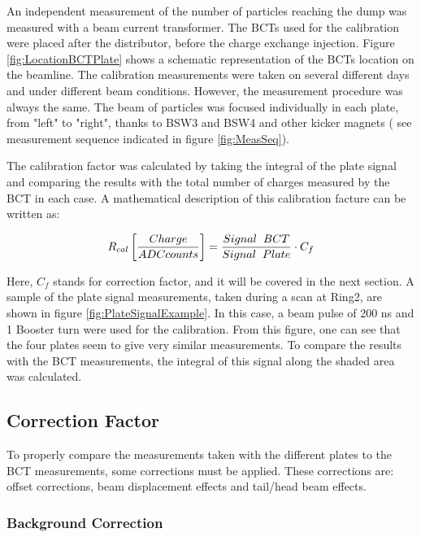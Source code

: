An independent measurement of the number of particles reaching the dump was measured with a beam current transformer. The BCTs used for the calibration were placed after the distributor, before the charge exchange injection. Figure \ref{fig:LocationBCTPlate} shows a schematic representation of the BCTs location on the beamline.  The calibration measurements were taken on several different days and under different beam conditions. However, the measurement procedure was always the same. The beam of particles was focused individually in each plate, from "left" to "right", thanks to BSW3 and BSW4 and other kicker magnets ( see measurement sequence indicated in figure \ref{fig:MeasSeq}). 

The calibration factor was calculated by taking the integral of the plate signal and comparing the results with the total number of charges measured by the BCT in each case. A mathematical description of this calibration facture can be written as: 

\begin{equation}
    R_{cal}\left[\frac{Charge}{ADCcounts}\right] = \frac{Signal \hspace{0.2cm} BCT}{Signal \hspace{0.2cm} Plate}\cdot C_{f}
\end{equation}

Here, $C_f$ stands for correction factor, and it will be covered in the next section. A sample of the plate signal measurements, taken during a scan at Ring2, are shown in figure \ref{fig:PlateSignalExample}. In this case, a beam pulse of 200 ns and 1 Booster turn were used for the calibration. From this figure, one can see that the four plates seem to give very similar measurements. To compare the results with the BCT measurements, the integral of this signal along the shaded area was calculated.  

\subsection{Correction Factor}

To properly compare the measurements taken with the different plates to the BCT measurements, some corrections must be applied. These corrections are: offset corrections, beam displacement effects and tail/head beam effects. 

\subsubsection{Background Correction}

